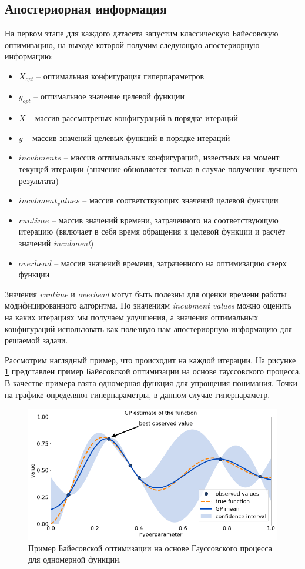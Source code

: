 \documentclass[times,specification,annotation]{itmo-student-thesis}
\begin{document}
	\subsection{Апостериорная информация} 
	На первом этапе для каждого датасета запустим классическую Байесовскую оптимизацию, на выходе которой получим следующую апостериорную информацию: 
	\begin{itemize}
		\item $ X_{opt} $ -- оптимальная конфигурация гиперпараметров
		\item $ y_{opt} $ -- оптимальное значение целевой функции
		\item $ X $ -- массив рассмотреных конфигураций в порядке итераций
		\item $ y $ -- массив значений целевых функций в порядке итераций
		\item $ incubments $ -- массив оптимальных конфигураций, известных на момент текущей итерации (значение обновляется только в случае получения лучшего результата)
		\item $ incubment_values $ -- массив соответствующих значений целевой функции
		\item $ runtime $ -- массив значений времени, затраченного на соответствующую итерацию (включает в себя время обращения к целевой функции и расчёт значений \textit{incubment})
		\item $ overhead $ -- массив значений времени, затраченного на оптимизацию сверх функции
	\end{itemize}
	Значения \textit{runtime} и \textit{overhead} могут быть полезны для оценки времени работы модифицированного алгоритма. По значениям \textit{incubment values} можно оценить на каких итерациях мы получаем улучшения, а значения оптимальных конфигураций использовать как полезную нам апостериорную информацию для решаемой задачи. \par 
	Рассмотрим наглядный пример, что происходит на каждой итерации. На рисунке \ref{img:bogp} представлен пример Байесовской оптимизации на основе гауссовского процесса. В качестве примера взята одномерная функция для упрощения понимания. Точки на графике определяют гиперпараметры, в данном случае гиперпараметр. 
	\begin{figure}[!ht]
		\caption{Пример Байесовской оптимизации на основе Гауссовского процесса для одномерной функции.}\label{img:bogp}
		\includegraphics[width=0.85\linewidth]{bo_gp}
		\centering
	\end{figure}
\end{document}
